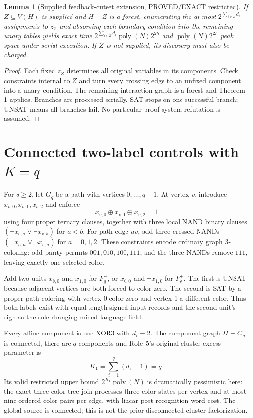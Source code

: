 \documentclass[11pt]{article}
\newtheorem{lemma}{Lemma}
\begin{document}
\begin{lemma}[Supplied feedback-cutset extension, PROVED/EXACT restricted]
If $Z\subseteq V(H)$ is supplied and $H-Z$ is a forest, enumerating
the at most $2^{\sum_{i\in Z}d_i}$ assignments to $z_Z$ and
absorbing each boundary condition into the remaining unary
tables yields exact time
$2^{\sum_{i\in Z}d_i}\operatorname{poly}(N)2^{2h}$ and
$\operatorname{poly}(N)2^{2h}$ peak space under serial execution.
If $Z$ is not supplied, its discovery must also be charged.
\end{lemma}
\begin{proof}
Each fixed $z_Z$ determines all original variables in its
components. Check constraints internal to $Z$ and turn every
crossing edge to an unfixed component into a unary condition.
The remaining interaction graph is a forest and Theorem 1
applies. Branches are processed serially. SAT stops on one
successful branch; UNSAT means all branches fail. No particular
proof-system refutation is assumed.
\end{proof}

\section{Connected two-label controls with $K=q$}
For $q\ge2$, let $G_q$ be a path with vertices
$0,\ldots,q-1$. At vertex $v$, introduce
$x_{v,0},x_{v,1},x_{v,2}$ and enforce
\[
x_{v,0}\oplus x_{v,1}\oplus x_{v,2}=1
\]
using four proper ternary clauses, together with three
local NAND binary clauses
$(\neg x_{v,a}\vee\neg x_{v,b})$ for $a<b$.
For path edge $uv$, add three crossed NANDs
$(\neg x_{u,a}\vee\neg x_{v,a})$ for $a=0,1,2$.
These constraints encode ordinary graph 3-coloring:
odd parity permits $001,010,100,111$, and the three
NANDs remove $111$, leaving exactly one selected color.

Add two units $x_{0,0}$ and $x_{1,0}$ for $F_q^-$,
or $x_{0,0}$ and $\neg x_{1,0}$ for $F_q^+$.
The first is UNSAT because adjacent vertices are
both forced to color zero. The second is SAT
by a proper path coloring with vertex 0 color zero
and vertex 1 a different color. Thus both labels exist
with equal-length signed input records and the second
unit's sign as the sole changing mixed-language field.

Every affine component is one XOR3 with
$d_i=2$. The component graph $H=G_q$ is connected,
there are $q$ components and Role~5's original
cluster-excess parameter is
\[
K_1=\sum_{i=1}^{q}(d_i-1)=q.
\tag{4}
\]
Its valid restricted upper bound $2^{K_1}\operatorname{poly}(N)$
is dramatically pessimistic here: the exact three-color
tree join processes three color states per vertex and at most
nine ordered color pairs per edge, with linear post-recognition
word cost. The global source is connected; this is not the
prior disconnected-cluster factorization.
\end{document}

